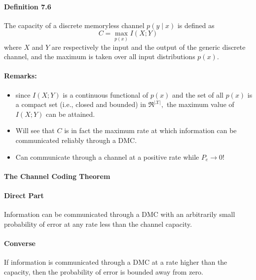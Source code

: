 \documentclass[8pt]{article}
\begin{document}
\paragraph{Definition 7.6} The capacity of a discrete memoryless channel $p(y \mid x)$ is defined
as
$$
C=\max _{p(x)} I(X ; Y)
$$
where $X$ and $Y$ are respectively the input and the output of the generic discrete channel, and the maximum is taken over all input distributions $p(x)$.
\paragraph{Remarks:}
\begin{itemize}
	\item since $I(X ; Y)$ is a continuous functional of $p(x)$ and the set of all $p(x)$ is a compact set (i.e., closed and bounded) in $\Re^{|\mathcal{X}|},$ the maximum value of $I(X ; Y)$ can be attained.
	\item Will see that $C$ is in fact the maximum rate at which information can be communicated reliably through a DMC.
	\item Can communicate through a channel at a positive rate while $P_{e} \rightarrow 0 !$
\end{itemize}

\paragraph{The Channel Coding Theorem}
\paragraph{Direct Part} Information can be communicated through a DMC with an arbitrarily small probability of error at any rate less than the channel capacity.
\paragraph{Converse} If information is communicated through a DMC at a rate higher than the capacity, then the probability of error is bounded away from zero.
\end{document}
